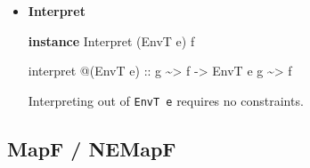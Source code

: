 \documentclass[]{article}
\newenvironment{Shaded}{}{}
\newcommand{\DataTypeTok}[1]{\textcolor[rgb]{0.56,0.13,0.00}{#1}}
\newcommand{\KeywordTok}[1]{\textcolor[rgb]{0.00,0.44,0.13}{\textbf{#1}}}
\newcommand{\NormalTok}[1]{#1}
\newcommand{\OperatorTok}[1]{\textcolor[rgb]{0.40,0.40,0.40}{#1}}
\newcommand{\OtherTok}[1]{\textcolor[rgb]{0.00,0.44,0.13}{#1}}
\begin{document}
\begin{itemize}
\item
  \textbf{Interpret}

\begin{Shaded}
\begin{Highlighting}[]
\KeywordTok{instance} \DataTypeTok{Interpret}\NormalTok{ (}\DataTypeTok{EnvT}\NormalTok{ e) f}

\NormalTok{interpret }\OperatorTok{@}\NormalTok{(}\DataTypeTok{EnvT}\NormalTok{ e)}
\OtherTok{    ::}\NormalTok{ g }\OperatorTok{\textasciitilde{}\textgreater{}}\NormalTok{ f}
    \OtherTok{{-}\textgreater{}} \DataTypeTok{EnvT}\NormalTok{ e g }\OperatorTok{\textasciitilde{}\textgreater{}}\NormalTok{ f}
\end{Highlighting}
\end{Shaded}

  Interpreting out of \texttt{EnvT\ e} requires no constraints.
\end{itemize}

\subsection{MapF / NEMapF}\label{mapf-nemapf}
\end{document}

